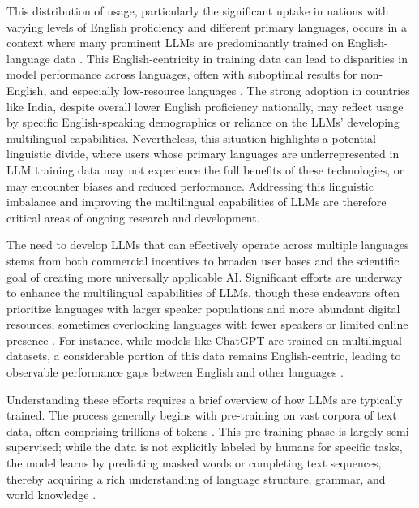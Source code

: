 This distribution of usage, particularly the significant uptake in nations with varying levels of English proficiency and different primary languages, occurs in a context where many prominent LLMs are predominantly trained on English-language data \cite{zhang2023donttrustchatgptquestion, hao2024mindthegap}. This English-centricity in training data can lead to disparities in model performance across languages, often with suboptimal results for non-English, and especially low-resource languages \cite{li2025fauxpolyglot}. The strong adoption in countries like India, despite overall lower English proficiency nationally, may reflect usage by specific English-speaking demographics or reliance on the LLMs' developing multilingual capabilities. Nevertheless, this situation highlights a potential linguistic divide, where users whose primary languages are underrepresented in LLM training data may not experience the full benefits of these technologies, or may encounter biases and reduced performance. Addressing this linguistic imbalance and improving the multilingual capabilities of LLMs are therefore critical areas of ongoing research and development.

The need to develop LLMs that can effectively operate across multiple languages stems from both commercial incentives to broaden user bases and the scientific goal of creating more universally applicable AI. Significant efforts are underway to enhance the multilingual capabilities of LLMs, though these endeavors often prioritize languages with larger speaker populations and more abundant digital resources, sometimes overlooking languages with fewer speakers or limited online presence \cite{ahuja2023megamultilingualevaluationgenerative}. For instance, while models like ChatGPT are trained on multilingual datasets, a considerable portion of this data remains English-centric, leading to observable performance gaps between English and other languages \cite{lai2023chatgptenglishcomprehensiveevaluation}.

Understanding these efforts requires a brief overview of how LLMs are typically trained. The process generally begins with pre-training on vast corpora of text data, often comprising trillions of tokens \cite{laurençon2023bigsciencerootscorpus16tb}. This pre-training phase is largely semi-supervised; while the data is not explicitly labeled by humans for specific tasks, the model learns by predicting masked words or completing text sequences, thereby acquiring a rich understanding of language structure, grammar, and world knowledge \cite{radford2018improving, devlin2018bert, rogers2020primer}.

